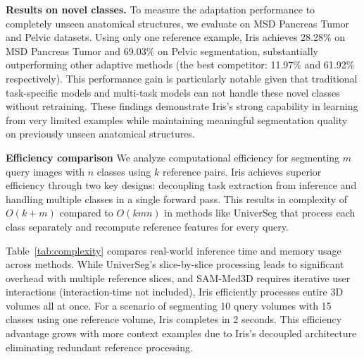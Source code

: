 \noindent\textbf{Results on novel classes.} To measure the adaptation performance to completely unseen anatomical structures, we evaluate on MSD Pancreas Tumor and Pelvic datasets. Using only one reference example, Iris achieves 28.28\% on MSD Pancreas Tumor and 69.03\% on Pelvic segmentation, substantially outperforming other adaptive methods (the best competitor: 11.97\% and 61.92\% respectively). This performance gain is particularly notable given that traditional task-specific models and multi-task models can not handle these novel classes without retraining. These findings demonstrate Iris's strong capability in learning from very limited examples while maintaining meaningful segmentation quality on previously unseen anatomical structures.




\noindent\textbf{Efficiency comparison}
 We analyze computational efficiency for segmenting $m$ query images with $n$ classes using $k$ reference pairs. Iris achieves superior efficiency through two key designs: decoupling task extraction from inference and handling multiple classes in a single forward pass. This results in complexity of $O(k + m)$ compared to $O(kmn)$ in methods like UniverSeg that process each class separately and recompute reference features for every query.

Table~\ref{tab:complexity} compares real-world inference time and memory usage across methods. While UniverSeg's slice-by-slice processing leads to significant overhead with multiple reference slices, and SAM-Med3D requires iterative user interactions (interaction-time not included), Iris efficiently processes entire 3D volumes all at once. For a scenario of segmenting 10 query volumes with 15 classes using one reference volume, Iris completes in 2 seconds. This efficiency advantage grows with more context examples due to Iris's decoupled architecture eliminating redundant reference processing.

\begin{table}[t]
\centering
\caption{Comparison of computational complexity. Empirical measurements of computation on one NVIDIA A100 GPU. We inference with 10 query images and one reference image from AMOS CT dataset with 15 classes. The image size is processed to $128\times128\times128$ for inference.}
\label{tab:complexity}
\vspace{-1em}
\end{table}



